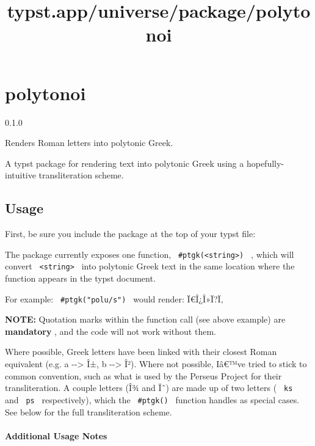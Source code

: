 \title{typst.app/universe/package/polytonoi}

\label{banner}
\section{polytonoi}\label{polytonoi}

{ 0.1.0 }

Renders Roman letters into polytonic Greek.

\label{readme}
A typst package for rendering text into polytonic Greek using a
hopefully-intuitive transliteration scheme.

\subsection{Usage}\label{usage}

First, be sure you include the package at the top of your typst file:

\begin{Shaded}
\begin{Highlighting}[]
\end{Highlighting}
\end{Shaded}

The package currently exposes one function,
\texttt{\ \#ptgk(\textless{}string\textgreater{})\ } , which will
convert \texttt{\ \textless{}string\textgreater{}\ } into polytonic
Greek text in the same location where the function appears in the typst
document.

For example: \texttt{\ \#ptgk("polu/s")\ } would render: Ï€Î¿Î»Ï?Ï‚

\textbf{NOTE:} Quotation marks within the function call (see above
example) are \textbf{mandatory} , and the code will not work without
them.

Where possible, Greek letters have been linked with their closest Roman
equivalent (e.g. a -\/-\textgreater{} Î±, b -\/-\textgreater{} Î²).
Where not possible, Iâ€™ve tried to stick to common convention, such as
what is used by the Perseus Project for their transliteration. A couple
letters (Î¾ and Ïˆ) are made up of two letters ( \texttt{\ ks\ } and
\texttt{\ ps\ } respectively), which the \texttt{\ \#ptgk()\ } function
handles as special cases. See below for the full transliteration scheme.

\paragraph{Additional Usage Notes}\label{additional-usage-notes}

